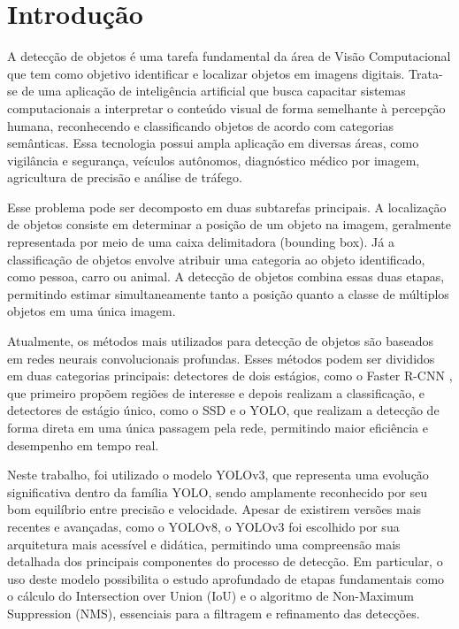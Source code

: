 \documentclass[conference]{IEEEtran}
\begin{document}
\section{Introdução}
A detecção de objetos é uma tarefa fundamental da área de Visão Computacional que tem como objetivo identificar e localizar objetos em imagens digitais. Trata-se de uma aplicação de inteligência artificial que busca capacitar sistemas computacionais a interpretar o conteúdo visual de forma semelhante à percepção humana, reconhecendo e classificando objetos de acordo com categorias semânticas. Essa tecnologia possui ampla aplicação em diversas áreas, como vigilância e segurança, veículos autônomos, diagnóstico médico por imagem, agricultura de precisão e análise de tráfego.

Esse problema pode ser decomposto em duas subtarefas principais. A localização de objetos consiste em determinar a posição de um objeto na imagem, geralmente representada por meio de uma caixa delimitadora (bounding box). Já a classificação de objetos envolve atribuir uma categoria ao objeto identificado, como pessoa, carro ou animal. A detecção de objetos combina essas duas etapas, permitindo estimar simultaneamente tanto a posição quanto a classe de múltiplos objetos em uma única imagem.

Atualmente, os métodos mais utilizados para detecção de objetos são baseados em redes neurais convolucionais profundas. Esses métodos podem ser divididos em duas categorias principais: detectores de dois estágios, como o Faster R-CNN \cite{ren2015fasterrcnn}, que primeiro propõem regiões de interesse e depois realizam a classificação, e detectores de estágio único, como o SSD \cite{liu2016ssd} e o YOLO, que realizam a detecção de forma direta em uma única passagem pela rede, permitindo maior eficiência e desempenho em tempo real.

Neste trabalho, foi utilizado o modelo YOLOv3, que representa uma evolução significativa dentro da família YOLO, sendo amplamente reconhecido por seu bom equilíbrio entre precisão e velocidade. Apesar de existirem versões mais recentes e avançadas, como o YOLOv8, o YOLOv3 foi escolhido por sua arquitetura mais acessível e didática, permitindo uma compreensão mais detalhada dos principais componentes do processo de detecção. Em particular, o uso deste modelo possibilita o estudo aprofundado de etapas fundamentais como o cálculo do Intersection over Union (IoU) e o algoritmo de Non-Maximum Suppression (NMS), essenciais para a filtragem e refinamento das detecções.
\end{document}
